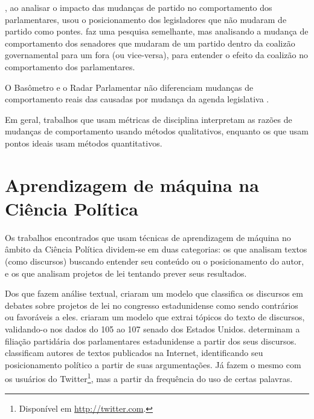 , ao analisar o impacto das mudanças de partido no
comportamento dos parlamentares, usou o posicionamento dos legisladores que não
mudaram de partido como pontes.  faz uma pesquisa
semelhante, mas analisando a mudança de comportamento dos senadores que mudaram
de um partido dentro da coalizão governamental para um fora (ou vice-versa),
para entender o efeito da coalizão no comportamento dos parlamentares.

O Basômetro e o Radar Parlamentar não diferenciam mudanças de comportamento
reais das causadas por mudança da agenda legislativa
\cite{Estadao2012,Trento2013}.

Em geral, trabalhos que usam métricas de disciplina interpretam as razões de
mudanças de comportamento usando métodos qualitativos, enquanto os que usam
pontos ideais usam métodos quantitativos.

\section{Aprendizagem de máquina na Ciência Política}
\label{ref:trabalhos-relacionados:data-science-polsci}

Os trabalhos encontrados que usam técnicas de aprendizagem de máquina no
âmbito da Ciência Política dividem-se em duas categorias: os que analisam
textos (como discursos) buscando entender seu conteúdo ou o posicionamento do
autor, e os que analisam projetos de lei tentando prever seus resultados.

Dos que fazem análise textual,  criaram um modelo que
classifica os discursos em debates sobre projetos de lei no congresso
estadunidense como sendo contrários ou favoráveis a eles.
 criaram um modelo que extrai tópicos do texto de
discursos, validando-o nos dados do 105\textordmasculine{} ao
107\textordmasculine{} senado dos Estados Unidos. 
determinam a filiação partidária dos parlamentares estadunidense a partir dos
seus discursos.  classificam autores de textos
publicados na Internet, identificando seu posicionamento político a partir de
suas argumentações. Já  fazem o mesmo com os usuários do
Twitter\footnote{Disponível em \url{http://twitter.com}.}, mas a partir da
frequência do uso de certas palavras.

